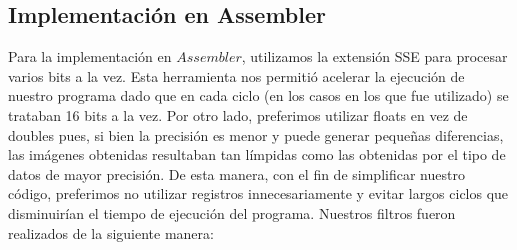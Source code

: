 \documentclass[10pt, a4paper]{article}
\begin{document}
\subsection{Implementación en Assembler}
Para la implementación en $Assembler$, utilizamos la extensión SSE para procesar varios bits a la vez. Esta herramienta nos permitió acelerar la ejecución de nuestro programa dado que en cada ciclo (en los casos en los que fue utilizado) se trataban 16 bits a la vez.
Por otro lado, preferimos utilizar floats en vez de doubles pues, si bien la precisión es menor y puede generar pequeñas diferencias, las imágenes obtenidas resultaban tan límpidas como las obtenidas por el tipo de datos de mayor precisión. De esta manera, con el fin de simplificar nuestro código, preferimos no utilizar registros innecesariamente y evitar largos ciclos que disminuirían el tiempo de ejecución del programa.  
\newline
Nuestros filtros fueron realizados de la siguiente manera:
\end{document}

